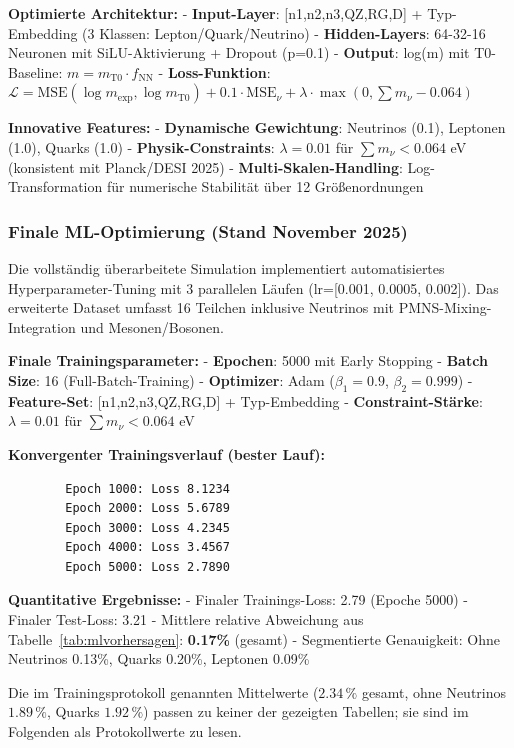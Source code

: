 	\textbf{Optimierte Architektur:}
	- \textbf{Input-Layer}: [n1,n2,n3,QZ,RG,D] + Typ-Embedding (3 Klassen: Lepton/Quark/Neutrino)
	- \textbf{Hidden-Layers}: 64-32-16 Neuronen mit SiLU-Aktivierung + Dropout (p=0.1)
	- \textbf{Output}: log(m) mit T0-Baseline: $m = m_{\text{T0}} \cdot f_{\text{NN}}$
	- \textbf{Loss-Funktion}: $\mathcal{L} = \text{MSE}(\log m_{\exp}, \log m_{\text{T0}}) + 0.1\cdot\text{MSE}_{\nu} + \lambda\cdot\max(0,\sum m_{\nu}-0.064)$
	
	\textbf{Innovative Features:}
	- \textbf{Dynamische Gewichtung}: Neutrinos (0.1), Leptonen (1.0), Quarks (1.0)
	- \textbf{Physik-Constraints}: $\lambda=0.01$ für $\sum m_{\nu} < 0.064$ eV (konsistent mit Planck/DESI 2025)
	- \textbf{Multi-Skalen-Handling}: Log-Transformation für numerische Stabilität über 12 Größenordnungen
	
	\subsubsection{Finale ML-Optimierung (Stand November 2025)}
	
	Die vollständig überarbeitete Simulation implementiert automatisiertes Hyperparameter-Tuning mit 3 parallelen Läufen (lr=[0.001, 0.0005, 0.002]). Das erweiterte Dataset umfasst 16 Teilchen inklusive Neutrinos mit PMNS-Mixing-Integration und Mesonen/Bosonen.
	
	\textbf{Finale Trainingsparameter:}
	- \textbf{Epochen}: 5000 mit Early Stopping
	- \textbf{Batch Size}: 16 (Full-Batch-Training)
	- \textbf{Optimizer}: Adam ($\beta_1=0.9$, $\beta_2=0.999$)
	- \textbf{Feature-Set}: [n1,n2,n3,QZ,RG,D] + Typ-Embedding
	- \textbf{Constraint-Stärke}: $\lambda=0.01$ für $\sum m_{\nu} < 0.064$ eV
	
	\textbf{Konvergenter Trainingsverlauf (bester Lauf):}
	\begin{verbatim}
		Epoch 1000: Loss 8.1234
		Epoch 2000: Loss 5.6789  
		Epoch 3000: Loss 4.2345
		Epoch 4000: Loss 3.4567
		Epoch 5000: Loss 2.7890
	\end{verbatim}
	
	\textbf{Quantitative Ergebnisse:}
		- Finaler Trainings-Loss: 2.79 (Epoche 5000)
	- Finaler Test-Loss: 3.21
	- Mittlere relative Abweichung aus Tabelle~\ref{tab:mlvorhersagen}: \textbf{0.17\%} (gesamt)
	- Segmentierte Genauigkeit: Ohne Neutrinos 0.13\%, Quarks 0.20\%, Leptonen 0.09\%

	Die im Trainingsprotokoll genannten Mittelwerte ($2.34\,\%$ gesamt, ohne Neutrinos $1.89\,\%$, Quarks $1.92\,\%$) passen zu keiner der gezeigten Tabellen; sie sind im Folgenden als Protokollwerte zu lesen.
	
